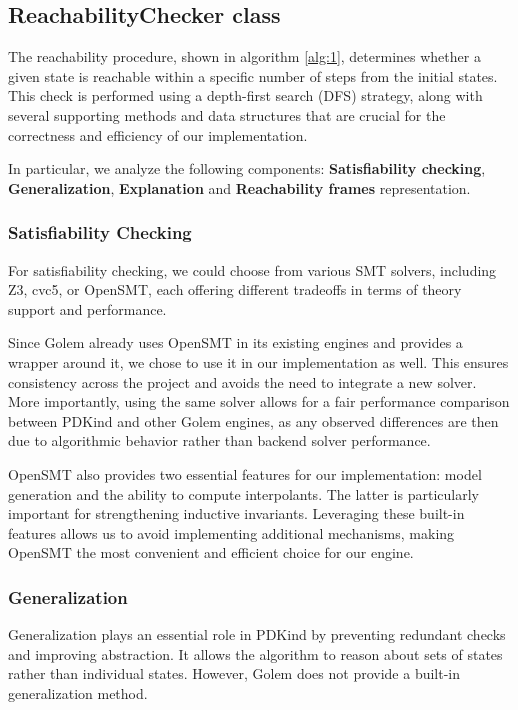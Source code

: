 \subsection{ReachabilityChecker class}

The reachability procedure, shown in algorithm \ref{alg:1}, determines whether
a given state is reachable within a specific number of steps from the initial
states. This check is performed using a depth-first search (DFS) strategy,
along with several supporting methods and data structures that are crucial for
the correctness and efficiency of our implementation.

In particular, we analyze the following components: \textbf{Satisfiability checking}, \textbf{Generalization}, \textbf{Explanation} and \textbf{Reachability frames} representation.
\subsubsection*{Satisfiability Checking}

\noindent For satisfiability checking, we could choose from various SMT
solvers, including Z3\cite{10.1007/978-3-540-78800-3_24},
cvc5\cite{10.1007/978-3-030-99524-9_24}, or
OpenSMT\cite{10.1007/978-3-642-12002-2_12}, each offering different tradeoffs
in terms of theory support and performance.

Since Golem already uses OpenSMT in its existing engines and provides a wrapper
around it, we chose to use it in our implementation as well. This ensures
consistency across the project and avoids the need to integrate a new solver.
More importantly, using the same solver allows for a fair performance
comparison between PDKind and other Golem engines, as any observed differences
are then due to algorithmic behavior rather than backend solver performance.

OpenSMT also provides two essential features for our implementation: model
generation and the ability to compute interpolants. The latter is particularly
important for strengthening inductive invariants. Leveraging these built-in
features allows us to avoid implementing additional mechanisms, making OpenSMT
the most convenient and efficient choice for our engine.

\subsubsection*{Generalization}

\noindent Generalization plays an essential role in PDKind by preventing
redundant checks and improving abstraction. It allows the algorithm to reason
about sets of states rather than individual states. However, Golem does not
provide a built-in generalization method.

